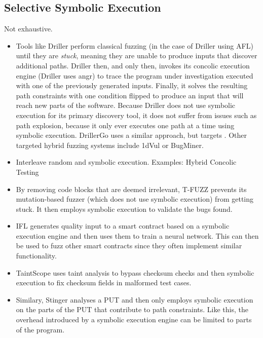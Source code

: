 \documentclass{article}
\begin{document}
\begin{multicols}{2}
  \subsection{Selective Symbolic Execution}
  \label{HybridFuzzing}
  Not exhaustive.
  \begin{itemize}
    \item Tools like Driller\cite{Driller} perform classical fuzzing (in the case of Driller using AFL\cite{AFLPlusPlus}) until they are \textit{stuck}, meaning they are unable to produce inputs that discover additional paths. Driller then, and only then, invokes its concolic execution engine (Driller uses angr\cite{angr}) to trace the program under investigation executed with one of the previously generated inputs. Finally, it solves the resulting path constraints with one condition flipped to produce an input that will reach new parts of the software. Because Driller does not use symbolic execution for its primary discovery tool, it does not suffer from issues such as path explosion, because it only ever executes one path at a time using symbolic execution. DrillerGo\cite{DrillerGo} uses a similar approach, but targets \cite{DrillerGo}. Other targeted hybrid fuzzing systems include 1dVul\cite{1dVul} or BugMiner\cite{BugMiner}.
    \item Interleave random and symbolic execution. Examples: Hybrid Concolic Testing\cite{HCT, Driller, Cyberdyne}
    \item By removing code blocks that are deemed irrelevant, T-FUZZ\cite{TFuzz} prevents its mutation-based fuzzer (which does not use symbolic execution) from getting stuck. It then employs symbolic execution to validate the bugs found.
    \item IFL\cite{IFL} generates quality input to a smart contract based on a symbolic execution engine and then uses them to train a neural network. This can then be used to fuzz other smart contracts since they often implement similar functionality.
    \item TaintScope\cite{TaintScope} uses taint analysis to bypass checksum checks and then symbolic execution to fix checksum fields in malformed test cases.
    \item Similary, Stinger\cite{Stinger} analyses a PUT and then only employs symbolic execution on the parts of the PUT that contribute to path constraints. Like this, the overhead introduced by a symbolic execution engine can be limited to parts of the program.
  \end{itemize}


\end{multicols}
\end{document}
